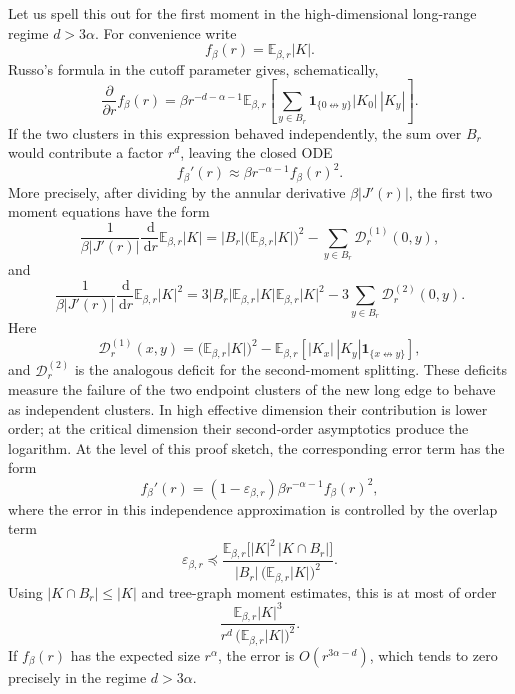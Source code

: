 \documentclass[11pt,reqno]{book}
\numberwithin{equation}{chapter}
\theoremstyle{plain}
\theoremstyle{definition}
\theoremstyle{remark}
\newcommand{\E}{\mathbb E}
\newcommand{\1}{\mathbf 1}
\newcommand{\dd}{\,\mathrm d}
\newcommand{\pre}{\preceq}
\begin{document}
Let us spell this out for the first moment in the high-dimensional long-range regime $d>3\alpha$. For convenience write
\[
  f_{\beta}(r)=\mathbb E_{\beta,r}|K|.
\]
Russo's formula in the cutoff parameter gives, schematically,
\[
  \frac{\partial}{\partial r}f_\beta(r)
  =
  \beta r^{-d-\alpha-1}
  \mathbb E_{\beta,r}\left[
    \sum_{y\in B_r}
    \mathbf 1_{\{0\not\leftrightarrow y\}}
    |K_0|\,|K_y|
  \right].
\]
If the two clusters in this expression behaved independently, the sum over $B_r$ would contribute a factor $r^d$, leaving the closed ODE
\[
  f_\beta'(r)\approx \beta r^{-\alpha-1}f_\beta(r)^2.
\]
More precisely, after dividing by the annular derivative \(\beta |J'(r)|\), the first two moment equations have the form
\[
  \frac{1}{\beta |J'(r)|}
  \frac{\dd}{\dd r}\E_{\beta,r}|K|
  =
  |B_r|\bigl(\E_{\beta,r}|K|\bigr)^2
  -
  \sum_{y\in B_r}\mathscr D_r^{(1)}(0,y),
\]
and
\[
  \frac{1}{\beta |J'(r)|}
  \frac{\dd}{\dd r}\E_{\beta,r}|K|^2
  =
  3|B_r|\E_{\beta,r}|K|\E_{\beta,r}|K|^2
  -
  3\sum_{y\in B_r}\mathscr D_r^{(2)}(0,y).
\]
Here
\[
  \mathscr D_r^{(1)}(x,y)
  =
  \bigl(\E_{\beta,r}|K|\bigr)^2
  -
  \E_{\beta,r}\!\left[
    |K_x|\,|K_y|\mathbf 1_{\{x\not\leftrightarrow y\}}
  \right],
\]
and \(\mathscr D_r^{(2)}\) is the analogous deficit for the second-moment splitting. These deficits measure the failure of the two endpoint clusters of the new long edge to behave as independent clusters. In high effective dimension their contribution is lower order; at the critical dimension their second-order asymptotics produce the logarithm.
At the level of this proof sketch, the corresponding error term has the form
\[
  f_\beta'(r)
  =
  (1-\varepsilon_{\beta,r})
  \beta r^{-\alpha-1}f_\beta(r)^2,
\]
where the error in this independence approximation is controlled by the overlap term
\[
  \varepsilon_{\beta,r}
  \pre
  \frac{
    \mathbb E_{\beta,r}\bigl[|K|^2\,|K\cap B_r|\bigr]
  }{
    |B_r|\,\bigl(\mathbb E_{\beta,r}|K|\bigr)^2
  }.
\]
Using $|K\cap B_r|\leq |K|$ and tree-graph moment estimates, this is at most of order
\[
  \frac{\mathbb E_{\beta,r}|K|^3}{r^d\,\bigl(\mathbb E_{\beta,r}|K|\bigr)^2}.
\]
If $f_\beta(r)$ has the expected size $r^\alpha$, the error is $O(r^{3\alpha-d})$, which tends to zero precisely in the regime $d>3\alpha$.
\end{document}
